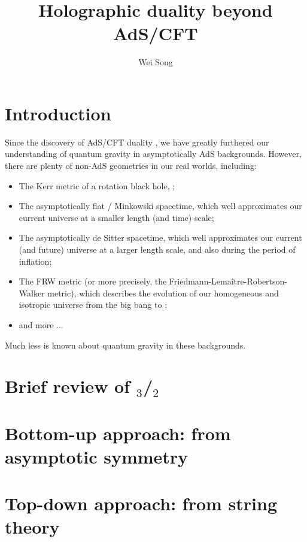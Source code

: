 \documentclass[11pt,a4paper]{article}
\title{Holographic duality beyond AdS/CFT}
\author[a]{Wei Song}
\affiliation[a]{Yau Mathematical Sciences Center, Tsinghua University, Beijing 100084, China}
\newcommand{\ads}[1]{\text{AdS}\ensuremath{_{#1}}}
\newcommand{\cft}[1]{\text{CFT}\ensuremath{_{#1}}}
\begin{document}
\maketitle
\setlength{\parskip}{.5\baselineskip}

\addtocounter{section}{-1}
\section{Introduction}
	
	Since the discovery of AdS/CFT duality \cite{Maldacena:1997re}, we have greatly furthered our understanding of quantum gravity in asymptotically AdS backgrounds. However, there are plenty of non-AdS geometries in our real worlds, including:
	\begin{itemize}%
	\item The Kerr metric of a rotation black hole, ;
	\item The asymptotically flat / Minkowski spacetime, which well approximates our current universe at a smaller length (and time) scale;
	\item The asymptotically de Sitter spacetime, which well approximates our current (and future) universe at a larger length scale, and also during the period of inflation;
	\item The FRW metric (or more precisely, the Friedmann-Lemaître-Robertson-Walker \cite{Friedmann:1924bb,Lemaitre:1933gd,Robertson:1935zz,Walker:1937} metric), which describes the evolution of our homogeneous and isotropic universe from the big bang to  ;
	\item and more ...
	\end{itemize}
	Much less is known about quantum gravity in these backgrounds. 
	
	
\section{Brief review of \ads{3}/\cft{2}}
	
\section{Bottom-up approach: %
			from asymptotic symmetry}
	
	
\section{Top-down approach: %
			from string theory}
	
\end{document}
